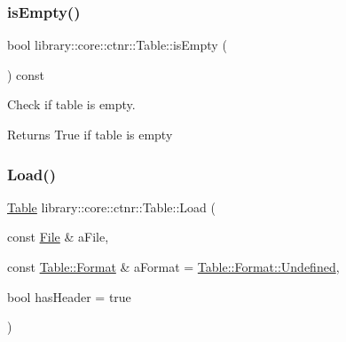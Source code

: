 \subsubsection{\texorpdfstring{isEmpty()}{isEmpty()}}
{\footnotesize\ttfamily bool library\+::core\+::ctnr\+::\+Table\+::is\+Empty (\begin{DoxyParamCaption}{ }\end{DoxyParamCaption}) const}



Check if table is empty. 


\begin{DoxyCode}{0}
\end{DoxyCode}


\begin{DoxyReturn}{Returns}
True if table is empty 
\end{DoxyReturn}
\mbox{\label{classlibrary_1_1core_1_1ctnr_1_1_table_a423b5a739e3ed0127bc14572042c158e}} 
\subsubsection{\texorpdfstring{Load()}{Load()}}
{\footnotesize\ttfamily \mbox{\hyperlink{classlibrary_1_1core_1_1ctnr_1_1_table}{Table}} library\+::core\+::ctnr\+::\+Table\+::\+Load (\begin{DoxyParamCaption}\item[{const \mbox{\hyperlink{classlibrary_1_1core_1_1fs_1_1_file}{File}} \&}]{a\+File,  }\item[{const \mbox{\hyperlink{classlibrary_1_1core_1_1ctnr_1_1_table_ab1d81689432c3a6bc960d33db1e11a4c}{Table\+::\+Format}} \&}]{a\+Format = {\ttfamily \mbox{\hyperlink{classlibrary_1_1core_1_1ctnr_1_1_table_ab1d81689432c3a6bc960d33db1e11a4caec0fc0100c4fc1ce4eea230c3dc10360}{Table\+::\+Format\+::\+Undefined}}},  }\item[{bool}]{has\+Header = {\ttfamily true} }\end{DoxyParamCaption})\hspace{0.3cm}{\ttfamily [static]}}



